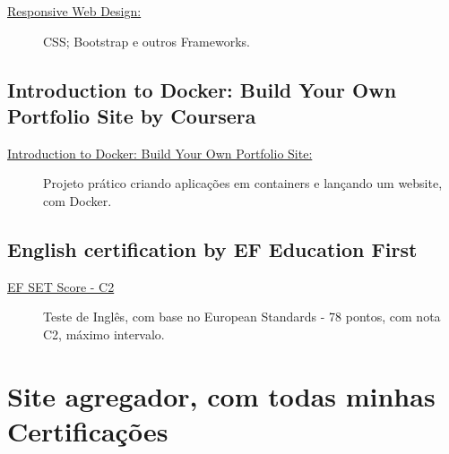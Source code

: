 \documentclass[letterpaper]{../cls/twentysecondcv} %
\begin{document}
    \begin{description}
      \item[\href{https://buddhilw.github.io/bug-free-fiesta/}{Responsive Web Design:}] CSS; Bootstrap e outros Frameworks.
    \end{description}

    \vspace{10mm}
    \subsection{\textbf{Introduction to Docker: Build Your Own Portfolio Site by Coursera}}

    \begin{description}
      \item[\href{https://buddhilw.github.io/bug-free-fiesta/}{Introduction to Docker: Build Your Own Portfolio Site:}] Projeto prático criando aplicações em containers e lançando um website, com Docker.
    \end{description}

    \vspace{10mm}
    \subsection{\textbf{English certification by EF Education First}}

    \begin{description}
      \item[\href{https://buddhilw.github.io/bug-free-fiesta/}{EF SET Score - C2}] Teste de Inglês, com base no European Standards - 78 pontos, com nota C2, máximo intervalo.
    \end{description}
    \vspace{5mm}
    \section{Site agregador, com todas minhas Certificações}

    \vspace{1mm}
\end{document}

